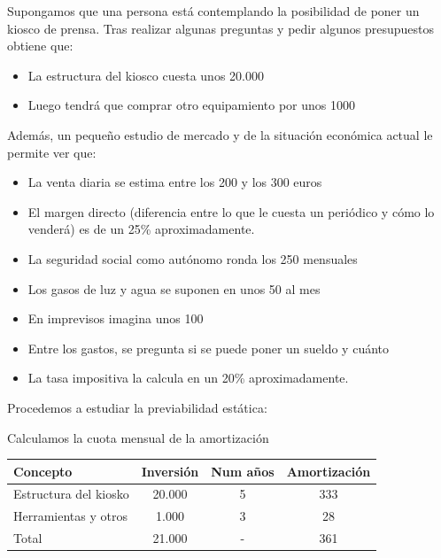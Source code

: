 \documentclass[nochap,palatino,shortheader]{apuntes}
\begin{document}
\begin{example}
Supongamos que una persona está contemplando la posibilidad de poner un kiosco de prensa. Tras realizar algunas preguntas y pedir algunos presupuestos obtiene que:

\begin{itemize}
\item La estructura del kiosco cuesta unos 20.000 \texteuro
\item Luego tendrá que comprar otro equipamiento por unos 1000 \texteuro
\end{itemize}


Además, un pequeño estudio de mercado y de la situación económica actual le permite ver que:
\begin{itemize}
\item La venta diaria se estima entre los 200 y los 300 euros

\item El margen directo (diferencia entre lo que le cuesta un periódico y cómo lo venderá) es de un 25\% aproximadamente.

\item La seguridad social como autónomo ronda los 250 \texteuro mensuales

\item Los gasos de luz y agua se suponen en unos 50 \texteuro al mes

\item En imprevisos imagina unos 100 \texteuro

\item Entre los gastos, se pregunta si se puede poner un sueldo y cuánto

\item La tasa impositiva la calcula en un 20\% aproximadamente.
\end{itemize}

Procedemos a estudiar la previabilidad estática:


\begin{center}
Calculamos la cuota mensual de la amortización
\end{center}

\begin{center}
\normalfont\small
\begin{tabular}{l|c|c|c}
\textbf{Concepto} & \textbf{Inversión} & \textbf{Num años} & \textbf{Amortización} \\
\toprule
Estructura del kiosko & 20.000 & 5 & 333\\
Herramientas y otros & 1.000 & 3 & 28 \\
\bottomrule
Total &21.000  & - & 361 \\
\end{tabular}
\end{center}


\end{example}
\end{document}
